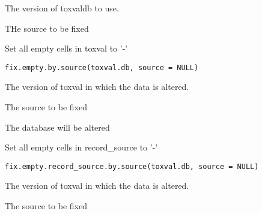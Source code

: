 \documentclass[letterpaper]{book}
\begin{document}
%
\begin{Arguments}
\begin{ldescription}
\item[\code{toxval.db}] The version of toxvaldb to use.

\item[\code{source}] THe source to be fixed
\end{ldescription}
\end{Arguments}
%
\begin{Description}\relax
Set all empty cells in toxval to '-'
\end{Description}
%
\begin{Usage}
\begin{verbatim}
fix.empty.by.source(toxval.db, source = NULL)
\end{verbatim}
\end{Usage}
%
\begin{Arguments}
\begin{ldescription}
\item[\code{toxval.db}] The version of toxval in which the data is altered.

\item[\code{source}] The source to be fixed
\end{ldescription}
\end{Arguments}
%
\begin{Value}
The database will be altered
\end{Value}
%
\begin{Description}\relax
Set all empty cells in record\_source to '-'
\end{Description}
%
\begin{Usage}
\begin{verbatim}
fix.empty.record_source.by.source(toxval.db, source = NULL)
\end{verbatim}
\end{Usage}
%
\begin{Arguments}
\begin{ldescription}
\item[\code{toxval.db}] The version of toxval in which the data is altered.

\item[\code{source}] The source to be fixed
\end{ldescription}
\end{Arguments}
\end{document}

